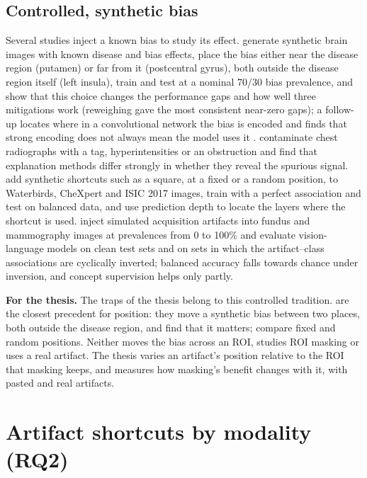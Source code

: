 \documentclass[11pt,a4paper]{article}
\newcommand{\takeaway}[1]{\par\smallskip\noindent\colorbox{gray!12}{\parbox{\dimexpr\linewidth-2\fboxsep}{\small\textbf{For the thesis.} #1}}\par\medskip}
\begin{document}
\subsection{Controlled, synthetic bias}
Several studies inject a known bias to study its effect. \citet{stanley2024simba} generate synthetic brain images with
known disease and bias effects, place the bias either near the disease region (putamen) or far from it (postcentral
gyrus), both outside the disease region itself (left insula), train and test at a nominal 70/30 bias prevalence, and
show that this choice changes the performance gaps and how well three mitigations work (reweighing gave the most
consistent near-zero gaps); a follow-up locates where in a convolutional network the bias is encoded and finds that strong encoding does not
always mean the model uses it \citep{stanley2025where}. \citet{sun2023right} contaminate chest radiographs with a tag,
hyperintensities or an obstruction and find that explanation methods differ strongly in whether they reveal the
spurious signal. \citet{boland2024shortcuts} add synthetic shortcuts such as a square, at a fixed or a random position, to
Waterbirds, CheXpert and ISIC 2017 images, train with a perfect association and test on balanced data, and use
prediction depth to locate the layers where the shortcut is used. \citet{corbetta2026beyond} inject simulated
acquisition artifacts into fundus and mammography images at prevalences from 0 to 100\% and evaluate vision-language
models on clean test sets and on sets in which the artifact--class associations are cyclically inverted; balanced
accuracy falls towards chance under inversion, and concept supervision helps only partly.
\takeaway{The traps of the thesis belong to this controlled tradition. \citet{stanley2024simba} are the closest precedent
for position: they move a synthetic bias between two places, both outside the disease region, and find that it
matters; \citet{boland2024shortcuts} compare fixed and random positions. Neither moves the bias across an ROI, studies
ROI masking or uses a real artifact. The thesis varies an artifact's position relative to the ROI that
masking keeps, and measures how masking's benefit changes with it, with pasted and real artifacts.}

\section{Artifact shortcuts by modality (RQ2)}\label{sec:modality}
\end{document}
